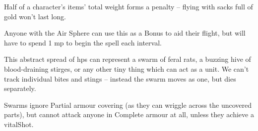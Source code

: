 \begin{multicols}{2}
Half of a character's items' total \gls{weight} forms a penalty -- flying with sacks full of gold won't last long.

Anyone with the Air Sphere can use this as a Bonus to aid their flight, but will have to spend 1 \gls{mp} to begin the spell each \gls{interval}.



This abstract spread of \glspl{hp} can represent a swarm of feral rats, a buzzing hive of blood-draining stirges, or any other tiny thing which can act as a unit.
We can't track individual bites and stings -- instead the swarm moves as one, but dies separately.

Swarms ignore Partial armour covering (as they can wriggle across the uncovered parts), but cannot attack anyone in Complete armour at all, unless they achieve a \gls{vitalShot}.




\end{multicols}
